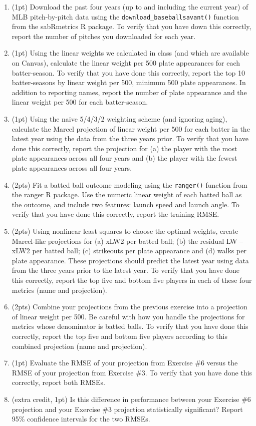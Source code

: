 \documentclass{article}
\begin{document}
      \begin{enumerate}
        \item (1pt) Download the past four years (up to and including the current year) of MLB pitch-by-pitch data using the \texttt{download\_baseballsavant()} function from the sabRmetrics R package. To verify that you have down this correctly, report the number of pitches you downloaded for each year.
        \item (1pt) Using the linear weights we calculated in class (and which are available on Canvas), calculate the linear weight per 500 plate appearances for each batter-season. To verify that you have done this correctly, report the top 10 batter-seasons by linear weight per 500, minimum 500 plate appearances. In addition to reporting names, report the number of plate appearance and the linear weight per 500 for each batter-season.
        \item (1pt) Using the naive 5/4/3/2 weighting scheme (and ignoring aging), calculate the Marcel projection of linear weight per 500 for each batter in the latest year using the data from the three years prior. To verify that you have done this correctly, report the projection for (a) the player with the most plate appearances across all four years and (b) the player with the fewest plate appearances across all four years.
        \item (2pts) Fit a batted ball outcome modeling using the \texttt{ranger()} function from the ranger R package. Use the numeric linear weight of each batted ball as the outcome, and include two features: launch speed and launch angle. To verify that you have done this correctly, report the training RMSE.
        \item (2pts) Using nonlinear least squares to choose the optimal weights, create Marcel-like projections for (a) xLW2 per batted ball; (b) the residual LW -- xLW2 per batted ball; (c) strikeouts per plate appearance and (d) walks per plate appearance. These projections should predict the latest year using data from the three years prior to the latest year. To verify that you have done this correctly, report the top five and bottom five players in each of these four metrics (name and projection).
        \item (2pts) Combine your projections from the previous exercise into a projection of linear weight per 500. Be careful with how you handle the projections for metrics whose denominator is batted balls. To verify that you have done this correctly, report the top five and bottom five players according to this combined projection (name and projection).
        \item (1pt) Evaluate the RMSE of your projection from Exercise \#6 versus the RMSE of your projection from Exercise \#3. To verify that you have done this correctly, report both RMSEs.
        \item (extra credit, 1pt) Is this difference in performance between your Exercise \#6 projection and your Exercise \#3 projection statistically significant? Report 95\% confidence intervals for the two RMSEs.
      \end{enumerate}
\end{document}
